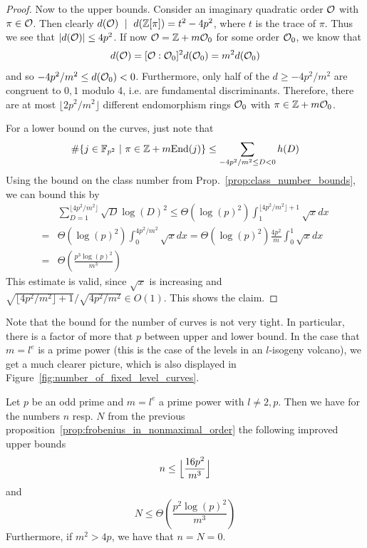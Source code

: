 \begin{proof}
    Now to the upper bounds.
    Consider an imaginary quadratic order $\mathcal{O}$ with $\pi \in \mathcal{O}$.
    Then clearly $d(\mathcal{O}) \ \mid \  d(\mathbb{Z}[\pi]) = t^2 - 4p^2$, where $t$ is the trace of $\pi$.
    Thus we see that $|d(\mathcal{O})| \leq 4p^2$.
    If now $\mathcal{O} = \mathbb{Z} + m\mathcal{O}_0$ for some order $\mathcal{O}_0$, we know that
    \begin{equation*}
        d(\mathcal{O}) = [\mathcal{O} : \mathcal{O}_0]^2 d(\mathcal{O}_0) = m^2 d(\mathcal{O}_0)
    \end{equation*}
    and so $-4p^2/m^2 \leq d(\mathcal{O}_0) < 0$.
    Furthermore, only half of the $d \geq -4p^2/m^2$ are congruent to $0, 1$ modulo 4, i.e. are fundamental discriminants.
    Therefore, there are at most $\lfloor 2p^2/m^2 \rfloor$ different endomorphism rings $\mathcal{O}_0$ with $\pi \in \mathbb{Z} + m\mathcal{O}_0$.

    For a lower bound on the curves, just note that
    \begin{equation*}
        \#\{ j \in \mathbb{F}_{p^2} \ | \ \pi \in \mathbb{Z} + m\mathrm{End}(j) \} \leq \sum_{-4p^2/m^2 \leq D < 0} h(D)
    \end{equation*}
    Using the bound on the class number from Prop.~\ref{prop:class_number_bounds}, we can bound this by
    \begin{align*}
        &\sum_{D = 1}^{\lfloor 4p^2/m^2 \rfloor} \sqrt{D} \log(D)^2 \leq \Theta(\log(p)^2) \int_1^{\lfloor 4p^2/m^2 \rfloor + 1} \sqrt{x} dx \\
        =& \Theta(\log(p)^2) \int_0^{4p^2/m^2} \sqrt{x} dx = \Theta(\log(p)^2) \frac {4p^2} m \int_0^1 \sqrt{x} dx \\
        =& \Theta\left( \frac {p^3\log(p)^2} {m^3} \right)
    \end{align*}
    This estimate is valid, since $\sqrt{x}$ is increasing and $\sqrt{\lfloor 4p^2/m^2 \rfloor + 1} / \sqrt{4p^2/m^2} \in O(1)$.
    This shows the claim.
\end{proof}
Note that the bound for the number of curves is not very tight.
In particular, there is a factor of more that $p$ between upper and lower bound.
In the case that $m = l^e$ is a prime power (this is the case of the levels in an $l$-isogeny volcano), we get a much clearer picture, which is also displayed in Figure~\ref{fig:number_of_fixed_level_curves}.
\begin{prop}
    \label{prop:counting_fp2_vulcano_levels}
    Let $p$ be an odd prime and $m = l^e$ a prime power with $l \neq 2, p$.
    Then we have for the numbers $n$ resp. $N$ from the previous proposition~\ref{prop:frobenius_in_nonmaximal_order} the following improved upper bounds
    \begin{equation*}
        n \leq \Bigl\lfloor \frac {16p^2} {m^3} \Bigr\rfloor
    \end{equation*}
    and
    \begin{equation*}
        N \leq \Theta\left( \frac {p^2\log(p)^2} {m^3} \right)
    \end{equation*}
    Furthermore, if $m^2 > 4p$, we have that $n = N = 0$.
\end{prop}
